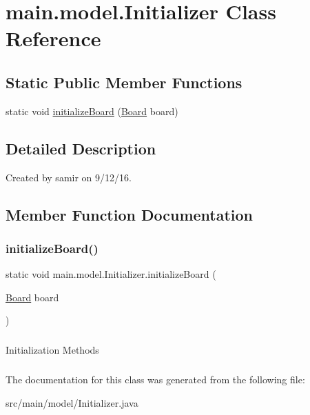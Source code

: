 \hypertarget{classmain_1_1model_1_1_initializer}{}\section{main.\+model.\+Initializer Class Reference}
\label{classmain_1_1model_1_1_initializer}
\subsection*{Static Public Member Functions}
\begin{DoxyCompactItemize}
\item 
static void \hyperlink{classmain_1_1model_1_1_initializer_a314022d0743a0169540f64e9b8b84988}{initialize\+Board} (\hyperlink{classmain_1_1model_1_1_board}{Board} board)
\end{DoxyCompactItemize}


\subsection{Detailed Description}
Created by samir on 9/12/16. 

\subsection{Member Function Documentation}
\hypertarget{classmain_1_1model_1_1_initializer_a314022d0743a0169540f64e9b8b84988}{}\label{classmain_1_1model_1_1_initializer_a314022d0743a0169540f64e9b8b84988} 
\subsubsection{\texorpdfstring{initialize\+Board()}{initializeBoard()}}
{\footnotesize\ttfamily static void main.\+model.\+Initializer.\+initialize\+Board (\begin{DoxyParamCaption}\item[{\hyperlink{classmain_1_1model_1_1_board}{Board}}]{board }\end{DoxyParamCaption})\hspace{0.3cm}{\ttfamily [static]}}

\subparagraph*{}

Initialization Methods \subparagraph*{}

The documentation for this class was generated from the following file\+:\begin{DoxyCompactItemize}
\item 
src/main/model/Initializer.\+java\end{DoxyCompactItemize}
